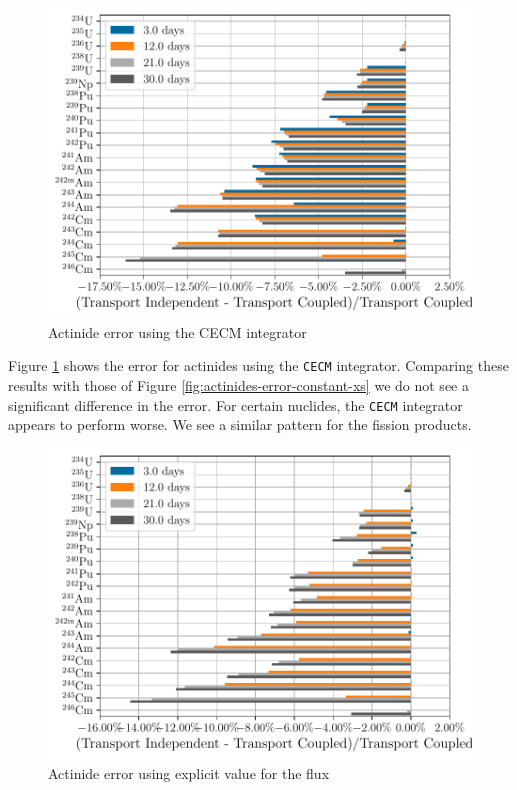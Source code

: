\documentclass[a4paper,fleqn]{cas-dc}
\begin{document}
    \begin{figure}[htpb]
        \centering
        \includegraphics[width=\linewidth]{figs/actinides_constant_xs_cecm_fission_q_days.pdf}
        \caption{Actinide error using the CECM integrator}
        \label{fig:actinides-error-cecm}
    \end{figure}


    Figure \ref{fig:actinides-error-cecm} shows the error for actinides using the
    \verb.CECM. integrator. Comparing these results with those of Figure
    \ref{fig:actinides-error-constant-xs} we do not see a significant difference
    in the error. For certain nuclides, the \verb.CECM. integrator appears to
    perform worse. We see a similar pattern for the fission products.

    \begin{figure}[htpb]
        \centering
        \includegraphics[width=\linewidth]{figs/actinides_constant_xs_predictor_source_rate_days.pdf}
        \caption{Actinide error using explicit value for the flux}
        \label{fig:actinides-error-source}
    \end{figure}
\end{document}
